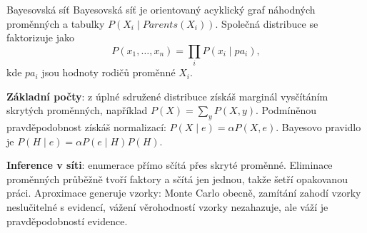 \begin{defbox}{Bayesovská síť}
Bayesovská síť je orientovaný acyklický graf náhodných proměnných a tabulky $P(X_i\mid Parents(X_i))$. Společná distribuce se faktorizuje jako
\[
P(x_1,\dots,x_n)=\prod_i P(x_i\mid pa_i),
\]
kde $pa_i$ jsou hodnoty rodičů proměnné $X_i$.
\end{defbox}

\textbf{Základní počty}: z úplné sdružené distribuce získáš marginál vysčítáním skrytých proměnných, například $P(X)=\sum_y P(X,y)$. Podmíněnou pravděpodobnost získáš normalizací: $P(X\mid e)=\alpha P(X,e)$. Bayesovo pravidlo je $P(H\mid e)=\alpha P(e\mid H)P(H)$.

\textbf{Inference v síti}: enumerace přímo sčítá přes skryté proměnné. Eliminace proměnných průběžně tvoří faktory a sčítá jen jednou, takže šetří opakovanou práci. Aproximace generuje vzorky: Monte Carlo obecně, zamítání zahodí vzorky neslučitelné s evidencí, vážení věrohodností vzorky nezahazuje, ale váží je pravděpodobností evidence.

